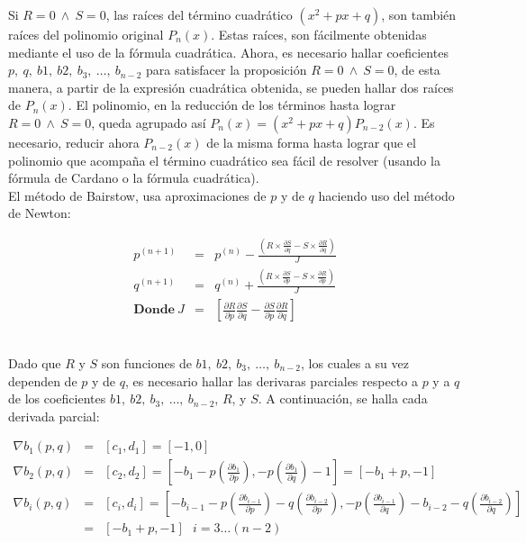 \documentclass[11pt, spanish]{article}
\begin{document}
Si $R = 0\ \wedge\ S = 0$, las raíces del término cuadrático $(x^2+px+q)$, son también raíces del polinomio original $P_n(x)$. Estas raíces, son fácilmente obtenidas mediante el uso de la fórmula cuadrática. Ahora, es necesario hallar coeficientes $p,\ q,\ b1,\ b2,\ b_3,\ \dots,\ b_{n-2}$ para satisfacer la proposición $R = 0\ \wedge\ S = 0$, de esta manera, a partir de la expresión cuadrática obtenida, se pueden hallar dos raíces de $P_n(x)$. El polinomio, en la reducción de los términos hasta lograr $R = 0\ \wedge\ S = 0$, queda agrupado así $P_n(x) = (x^2+px+q)P_{n-2}(x)$. Es necesario, reducir ahora $P_{n-2}(x)$ de la misma forma hasta lograr que el polinomio que acompaña el término cuadrático sea fácil de resolver (usando la fórmula de Cardano o la fórmula cuadrática).\\

El método de Bairstow, usa aproximaciones de $p$ y de $q$ haciendo uso del método de Newton:

\begin{eqnarray*}
p^{(n + 1)} & = & p^{(n)} - \frac{\left( R \times \frac{\partial S}{\partial q} - S \times \frac{\partial R}{\partial q}\right)}{J}\\
q^{(n + 1)} & = & q^{(n)} + \frac{\left( R \times \frac{\partial S}{\partial p} - S \times \frac{\partial R}{\partial p}\right)}{J} \\
\textbf{Donde}\ J & = & \left[\frac{\partial R}{\partial p} \frac{\partial S}{\partial q} - \frac{\partial S}{\partial p} \frac{\partial R}{\partial q}\right]
\end{eqnarray*}\

Dado que $R$ y $S$ son funciones de $b1,\ b2,\ b_3,\ \dots,\ b_{n-2}$, los cuales a su vez dependen de $p$ y de $q$, es necesario hallar las derivaras parciales respecto a $p$ y a $q$ de los coeficientes $b1,\ b2,\ b_3,\ \dots,\ b_{n-2}$, $R$, y $S$. A continuación, se halla cada derivada parcial:

\begin{eqnarray*}
\nabla b_{1}(p, q) & = & \left[ c_1, d_1 \right] = \left[ -1, 0 \right] \\
\nabla b_{2}(p, q) & = & \left[ c_2, d_2 \right] = \left[ -b_1 - p \left( \frac{\partial b_1}{\partial p}\right),  - p \left( \frac{\partial b_1}{\partial q}\right) - 1 \right] =  \left[ -b_1 + p, -1 \right]\\
\nabla b_{i}(p, q) & = & \left[ c_i, d_i \right] = \left[ -b_{i-1} - p \left( \frac{\partial b_{i-1}}{\partial p}\right) - q \left( \frac{\partial b_{i-2}}{\partial p}\right) ,  - p \left( \frac{\partial b_{i-1}}{\partial q}\right) - b_{i-2} - q \left( \frac{\partial b_{i-2}}{\partial q}\right) \right] \\
& = &\left[ -b_1 + p, -1 \right]\ \ \ i = 3 \dots (n - 2) \\
\end{eqnarray*}
\end{document}
